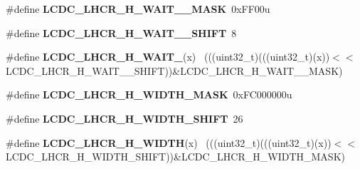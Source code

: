 \begin{DoxyCompactItemize}
\item 
\hypertarget{group___l_c_d_c___register___masks_gaed8e8fd40d9adfcb3c888852984c3352}{}\#define {\bfseries L\+C\+D\+C\+\_\+\+L\+H\+C\+R\+\_\+\+H\+\_\+\+W\+A\+I\+T\+\_\+\_\+\+M\+A\+S\+K}~0x\+F\+F00u\label{group___l_c_d_c___register___masks_gaed8e8fd40d9adfcb3c888852984c3352}

\item 
\hypertarget{group___l_c_d_c___register___masks_gaa618ebe7c9d79dd98935fec295a3d477}{}\#define {\bfseries L\+C\+D\+C\+\_\+\+L\+H\+C\+R\+\_\+\+H\+\_\+\+W\+A\+I\+T\+\_\+\_\+\+S\+H\+I\+F\+T}~8\label{group___l_c_d_c___register___masks_gaa618ebe7c9d79dd98935fec295a3d477}

\item 
\hypertarget{group___l_c_d_c___register___masks_gafb240b5d94636fd9e03739c4ff447212}{}\#define {\bfseries L\+C\+D\+C\+\_\+\+L\+H\+C\+R\+\_\+\+H\+\_\+\+W\+A\+I\+T\+\_}(x)                                    ~(((uint32\+\_\+t)(((uint32\+\_\+t)(x))$<$$<$L\+C\+D\+C\+\_\+\+L\+H\+C\+R\+\_\+\+H\+\_\+\+W\+A\+I\+T\+\_\+\_\+\+S\+H\+I\+F\+T))\&L\+C\+D\+C\+\_\+\+L\+H\+C\+R\+\_\+\+H\+\_\+\+W\+A\+I\+T\+\_\+\_\+\+M\+A\+S\+K)\label{group___l_c_d_c___register___masks_gafb240b5d94636fd9e03739c4ff447212}

\item 
\hypertarget{group___l_c_d_c___register___masks_gab1a245564f56fa5764a65b5550e44be5}{}\#define {\bfseries L\+C\+D\+C\+\_\+\+L\+H\+C\+R\+\_\+\+H\+\_\+\+W\+I\+D\+T\+H\+\_\+\+M\+A\+S\+K}~0x\+F\+C000000u\label{group___l_c_d_c___register___masks_gab1a245564f56fa5764a65b5550e44be5}

\item 
\hypertarget{group___l_c_d_c___register___masks_ga1983dcb65e008c231dbe44835d13aa9c}{}\#define {\bfseries L\+C\+D\+C\+\_\+\+L\+H\+C\+R\+\_\+\+H\+\_\+\+W\+I\+D\+T\+H\+\_\+\+S\+H\+I\+F\+T}~26\label{group___l_c_d_c___register___masks_ga1983dcb65e008c231dbe44835d13aa9c}

\item 
\hypertarget{group___l_c_d_c___register___masks_ga88e2f73fef3c9f146c0adf08c18aa501}{}\#define {\bfseries L\+C\+D\+C\+\_\+\+L\+H\+C\+R\+\_\+\+H\+\_\+\+W\+I\+D\+T\+H}(x)                                      ~(((uint32\+\_\+t)(((uint32\+\_\+t)(x))$<$$<$L\+C\+D\+C\+\_\+\+L\+H\+C\+R\+\_\+\+H\+\_\+\+W\+I\+D\+T\+H\+\_\+\+S\+H\+I\+F\+T))\&L\+C\+D\+C\+\_\+\+L\+H\+C\+R\+\_\+\+H\+\_\+\+W\+I\+D\+T\+H\+\_\+\+M\+A\+S\+K)\label{group___l_c_d_c___register___masks_ga88e2f73fef3c9f146c0adf08c18aa501}


\end{DoxyCompactItemize}
